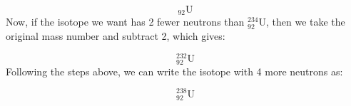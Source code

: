 {\begin{mdframed}[linewidth=4, leftmargin=40, rightmargin=40]
\begin{exercise}
\begin{enumerate}[noitemsep, label=\textbf{Step} \textbf{\arabic*}. ]
    \begin{equation}
    {}_{92}\mathrm{U}\tag{3.3}
      \end{equation}
        \label{m38753*id257684}Now, if the isotope we want has 2 fewer neutrons than $_{92}^{234}\mathrm{U}$,
then we take the original mass number and subtract 2, which gives:\par 
        \label{m38753*id257713}\nopagebreak\noindent{}
          
    \begin{equation}
    _{92}^{232}\mathrm{U}\tag{3.4}
      \end{equation}
        \label{m38753*id257736}Following the steps above, we can write the isotope with 4 more neutrons as:\par 
        \label{m38753*id257740}\nopagebreak\noindent{}
          
    \begin{equation}
    _{92}^{238}\mathrm{U}\tag{3.5}
      \end{equation}
 \end{enumerate}
    \end{exercise}
    \end{mdframed}
    }
    \noindent
\par
            \label{m38753*secfhsst!!!underscore!!!id466}\vspace{.5cm} 
      \noindent
